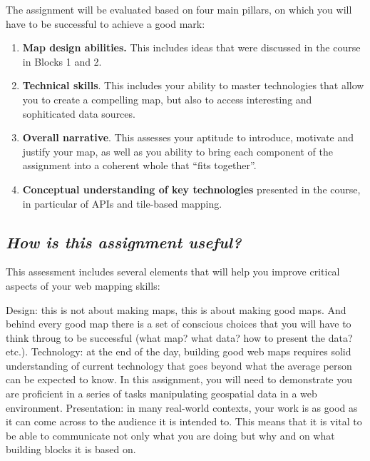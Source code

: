 \documentclass[
  letterpaper,
  DIV=11,
  numbers=noendperiod]{scrreprt}
\begin{document}
The assignment will be evaluated based on four main pillars, on which
you will have to be successful to achieve a good mark:

\begin{enumerate}
\def\labelenumi{\arabic{enumi}.}
\item
  \textbf{Map design abilities.} This includes ideas that were discussed
  in the course in Blocks 1 and 2.
\item
  \textbf{Technical skills}. This includes your ability to master
  technologies that allow you to create a compelling map, but also to
  access interesting and sophiticated data sources.
\item
  \textbf{Overall narrative}. This assesses your aptitude to introduce,
  motivate and justify your map, as well as you ability to bring each
  component of the assignment into a coherent whole that ``fits
  together''.
\item
  \textbf{Conceptual understanding of key technologies} presented in the
  course, in particular of APIs and tile-based mapping.
\end{enumerate}

\subsection*{\texorpdfstring{\emph{How is this assignment
useful?}}{How is this assignment useful?}}\label{how-is-this-assignment-useful}

This assessment includes several elements that will help you improve
critical aspects of your web mapping skills:

Design: this is not about making maps, this is about making good maps.
And behind every good map there is a set of conscious choices that you
will have to think throug to be successful (what map? what data? how to
present the data? etc.). Technology: at the end of the day, building
good web maps requires solid understanding of current technology that
goes beyond what the average person can be expected to know. In this
assignment, you will need to demonstrate you are proficient in a series
of tasks manipulating geospatial data in a web environment.
Presentation: in many real-world contexts, your work is as good as it
can come across to the audience it is intended to. This means that it is
vital to be able to communicate not only what you are doing but why and
on what building blocks it is based on.
\end{document}
